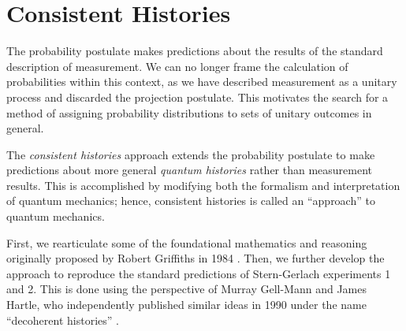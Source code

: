 \usetikzlibrary{shapes.geometric}
\usetikzlibrary{positioning}

\chapter{Consistent Histories}

The probability postulate makes predictions about the results of the standard description of measurement. We can no longer frame the calculation of probabilities within this context, as we have  described measurement as a unitary process and discarded the projection postulate. This motivates the search for a method of assigning probability distributions to sets of unitary outcomes in general.

The \textit{consistent histories} approach extends the probability postulate to make predictions about  more general \textit{quantum histories} rather than measurement results. This is accomplished by modifying both the formalism and interpretation of quantum mechanics; hence, consistent histories is called an ``approach'' to quantum mechanics.

First, we rearticulate some of the foundational mathematics and reasoning originally proposed by Robert Griffiths in 1984 \cite{old_griffiths}. Then, we further develop the approach to reproduce the standard predictions of Stern-Gerlach experiments 1 and 2. This is done using the perspective of Murray Gell-Mann and James Hartle, who independently published similar ideas in 1990 under the name ``decoherent histories'' \cite{gell}.

%
%
%
%


